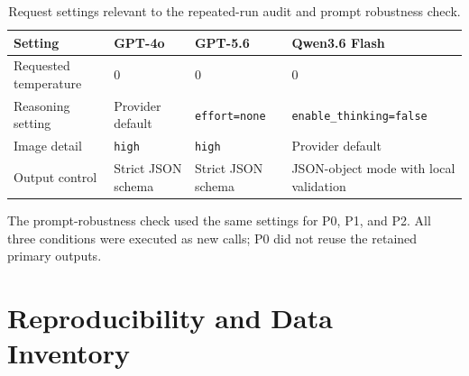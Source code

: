 \begin{table}[!htbp]
    \centering
    \caption{Request settings relevant to the repeated-run audit and prompt
    robustness check.}
    \label{tab:app_repeat_prompt_settings}
    \footnotesize
    \begin{tabularx}{\textwidth}{@{}L{0.18\textwidth}YYY@{}}
        \toprule
        Setting & GPT-4o & GPT-5.6 & Qwen3.6 Flash \\
        \midrule
        Requested temperature & 0 & 0 & 0 \\
        Reasoning setting & Provider default & \texttt{effort=none} &
        \texttt{enable\_thinking=false} \\
        Image detail & \texttt{high} & \texttt{high} & Provider default \\
        Output control & Strict JSON schema & Strict JSON schema & JSON-object
        mode with local validation \\
        \bottomrule
    \end{tabularx}
\end{table}

The prompt-robustness check used the same settings for P0, P1, and P2. All
three conditions were executed as new calls; P0 did not reuse the retained
primary outputs.


\chapter{Reproducibility and Data Inventory}
\label{app:reproducibility}

